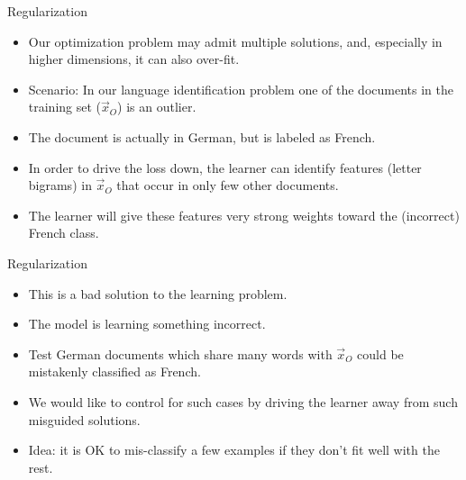 \documentclass[handout]{beamer}
\begin{document}
\begin{frame}{Regularization}
\begin{scriptsize}
\begin{itemize}
 \item Our optimization problem may admit multiple solutions, and, especially in higher dimensions, it can also over-fit.
 \item Scenario: In our language identification problem one of the documents in the training set ($\vec{x}_O$) is an outlier.
 \item The document is actually in German, but is labeled as French.
 
 \item In order to drive the loss down, the learner can identify features (letter bigrams) in $\vec{x}_O$ that occur in only few other documents.
 
 \item The learner will give these features very strong weights toward the (incorrect) French class. 

\end{itemize}
\end{scriptsize}

\end{frame}


\begin{frame}{Regularization}
\begin{scriptsize}
\begin{itemize}
  \item This is a bad solution to the learning problem.
 \item The model is learning something incorrect.
 \item Test German documents which share many words with $\vec{x}_O$ could be mistakenly classified as French. 
 \item We would like to control for such cases by driving the learner away from such misguided solutions.
 \item Idea: it is OK to mis-classify a few examples if they don't fit well with the rest.
 
\end{itemize}
\end{scriptsize}

\end{frame}
\end{document}
